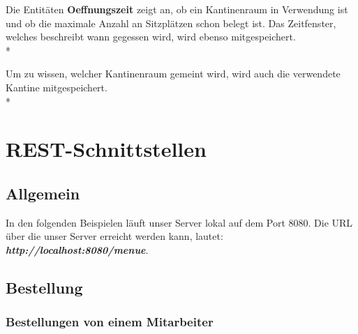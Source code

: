 Die Entitäten \textbf{Oeffnungszeit} zeigt an, ob ein Kantinenraum in Verwendung ist und ob die maximale Anzahl an Sitzplätzen schon belegt ist. 
Das Zeitfenster, welches beschreibt wann gegessen wird, wird ebenso mitgespeichert. \\*

Um zu wissen, welcher Kantinenraum gemeint wird, wird auch die verwendete Kantine mitgespeichert. \\*

\pagebreak

\section{REST-Schnittstellen}



\subsection{Allgemein}

In den folgenden Beispielen läuft unser Server lokal auf dem Port 8080. Die URL über die unser
Server erreicht werden kann, lautet: \textbf{\textit{http://localhost:8080/menue}}.

\subsection{Bestellung}

\subsubsection{Bestellungen von einem Mitarbeiter}


